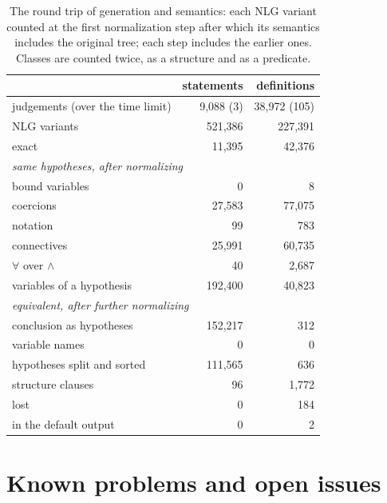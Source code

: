 \documentclass{easychair}
\begin{document}
\begin{table}[t]
\centering\small
\begin{tabular}{lrr}
\toprule
& statements & definitions \\
\midrule
judgements (over the time limit) & 9,088 (3) & 38,972 (105) \\
NLG variants & 521,386 & 227,391 \\
\midrule
exact & 11,395 & 42,376 \\
\midrule
\multicolumn{3}{l}{\textit{same hypotheses, after normalizing}} \\
\quad bound variables & 0 & 8 \\
\quad coercions & 27,583 & 77,075 \\
\quad notation & 99 & 783 \\
\quad connectives & 25,991 & 60,735 \\
\quad $\forall$ over $\wedge$ & 40 & 2,687 \\
\quad variables of a hypothesis & 192,400 & 40,823 \\
\midrule
\multicolumn{3}{l}{\textit{equivalent, after further normalizing}} \\
\quad conclusion as hypotheses & 152,217 & 312 \\
\quad variable names & 0 & 0 \\
\quad hypotheses split and sorted & 111,565 & 636 \\
\quad structure clauses & 96 & 1,772 \\
\midrule
lost & 0 & 184 \\
\quad in the default output & 0 & 2 \\
\bottomrule
\end{tabular}
\caption{The round trip of generation and semantics: each NLG variant counted at the first
normalization step after which its semantics includes the original tree; each step includes the
earlier ones. Classes are counted twice, as a structure and as a predicate.}
\label{tab:roundtrip}
\end{table}

\section{Known problems and open issues}
\label{sec:problems}
\end{document}
